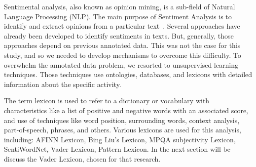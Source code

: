 Sentimental analysis, also known as opinion mining, is a sub-field of Natural Language Processing (NLP). The main purpose of Sentiment Analysis is to identify and extract opinions from a particular text~\cite{vader}. Several approaches have already been developed to identify sentiments in texts. But, generally, those approaches depend on previous annotated data. This was not the case for this study, and so we needed to develop mechanisms to overcome this difficulty. To overwhelm the annotated data problem, we resorted to unsupervised learning techniques. Those techniques use ontologies, databases, and lexicons with detailed information about the specific activity.

The term lexicon is used to refer to a dictionary or vocabulary with characteristics like a list of positive and negative words with an associated score, and use of techniques like word position, surrounding words, context analysis, part-of-speech, phrases, and others. Various lexicons are used for this analysis, including: AFINN Lexicon, Bing Liu's Lexicon, MPQA subjectivity Lexicon, SentiWordNet, Vader Lexicon, Pattern Lexicon. In the next section will be discuss the Vader Lexicon, chosen for that research. 


